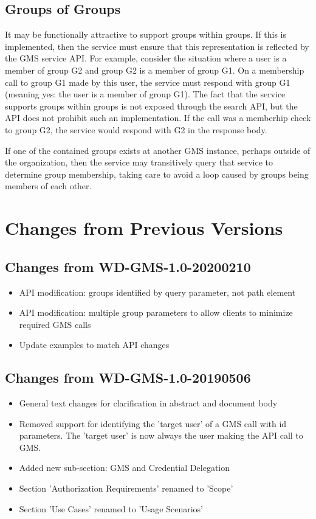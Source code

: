 \documentclass[11pt,a4paper]{ivoa}
\begin{document}
\subsection{Groups of Groups}
\label{subsec:groupsofgroups}

It may be functionally attractive to support groups within groups.  If this is implemented, then the service must ensure that this representation is reflected by the GMS service API.  For example, consider the situation where a user is a member of group G2 and group G2 is a member of group G1.  On a membership call to group G1 made by this user, the service must respond with group G1 (meaning yes: the user is a member of group G1).  The fact that the service supports groups within groups is not exposed through the search API, but the API does not prohibit such an implementation.  If the call was a memberhip check to group G2, the service would respond with G2 in the response body.

If one of the contained groups exists at another GMS instance, perhaps outside of the organization, then the service may transitively query that service to determine group membership, taking care to avoid a loop caused by groups being members of each other.

\appendix

\section{Changes from Previous Versions}
\label{sec:changehistory}

\subsection{Changes from WD-GMS-1.0-20200210}
\begin{itemize}
\item{API modification: groups identified by query parameter, not path element}
\item{API modification: multiple group parameters to allow clients to minimize required GMS calls}
\item{Update examples to match API changes}
\end{itemize}

\subsection{Changes from WD-GMS-1.0-20190506}
\begin{itemize}
\item{General text changes for clarification in abstract and document body}
\item{Removed support for identifying the 'target user' of a GMS call with id parameters.  The 'target user' is now always the user making the API call to GMS.}
\item{Added new sub-section: GMS and Credential Delegation}
\item{Section 'Authorization Requirements' renamed to 'Scope'}
\item{Section 'Use Cases' renamed to 'Usage Scenarios'}
\end{itemize}
\end{document}
